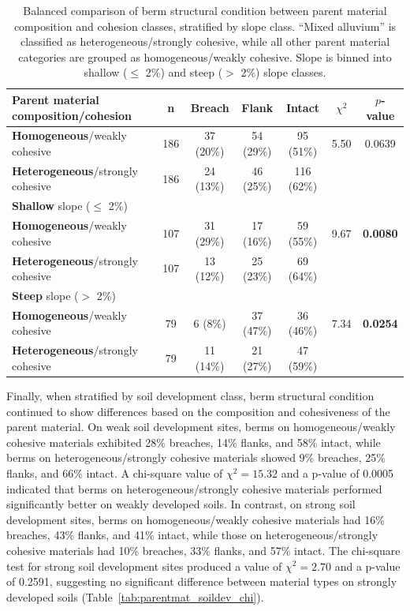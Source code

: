 \documentclass[review]{elsarticle}
\begin{document}
\begin{table}[h!]
\centering
\caption{\normalsize Balanced comparison of berm structural condition between parent material composition and cohesion classes, stratified by slope class. ``Mixed alluvium'' is classified as heterogeneous/strongly cohesive, while all other parent material categories are grouped as homogeneous/weakly cohesive. Slope is binned into shallow ($\leq$ 2\%) and steep ($>$ 2\%) slope classes.}
\small
\begin{tabular}{|l|c|c|c|c|c|c|}
\hline
\textbf{Parent material composition/cohesion} & \textbf{n} & \textbf{Breach} & \textbf{Flank} & \textbf{Intact} & \textbf{$\chi^2$} & \textbf{$p$-value} \\
\hline
\textbf{Homogeneous}/weakly cohesive & 186 & 37 (20\%) & 54 (29\%) & 95 (51\%) & 5.50 & 0.0639\\
\hline
\textbf{Heterogeneous}/strongly cohesive & 186 & 24 (13\%) & 46 (25\%) & 116 (62\%) &  &\\
\hline
\hline
\textbf{Shallow} slope ($\leq$ 2\%) & & & & & & \\
\hline
\textbf{Homogeneous}/weakly cohesive & 107 & 31 (29\%) & 17 (16\%) & 59 (55\%) & 9.67 & \textbf{0.0080} \\
\hline
\textbf{Heterogeneous}/strongly cohesive & 107 & 13 (12\%) & 25 (23\%) & 69 (64\%) &  & \\
\hline
\hline
\textbf{Steep} slope ($>$ 2\%) & & & & & & \\
\hline
\textbf{Homogeneous}/weakly cohesive & 79 & 6 (8\%) & 37 (47\%) & 36 (46\%) & 7.34 & \textbf{0.0254}\\
\hline
\textbf{Heterogeneous}/strongly cohesive & 79 & 11 (14\%) & 21 (27\%) & 47 (59\%) &  &  \\
\hline
\end{tabular}
\label{tab:parentmat_slope_chi}
\end{table}

Finally, when stratified by soil development class, berm structural condition continued to show differences based on the composition and cohesiveness of the parent material. On weak soil development sites, berms on homogeneous/weakly cohesive materials exhibited 28\% breaches, 14\% flanks, and 58\% intact, while berms on heterogeneous/strongly cohesive materials showed 9\% breaches, 25\% flanks, and 66\% intact. A chi-square value of $\chi^2 = 15.32$ and a p-value of 0.0005 indicated that berms on heterogeneous/strongly cohesive materials performed significantly better on weakly developed soils. In contrast, on strong soil development sites, berms on homogeneous/weakly cohesive materials had 16\% breaches, 43\% flanks, and 41\% intact, while those on heterogeneous/strongly cohesive materials had 10\% breaches, 33\% flanks, and 57\% intact. The chi-square test for strong soil development sites produced a value of $\chi^2 = 2.70$ and a p-value of 0.2591, suggesting no significant difference between material types on strongly developed soils (Table~\ref{tab:parentmat_soildev_chi}).
\end{document}
